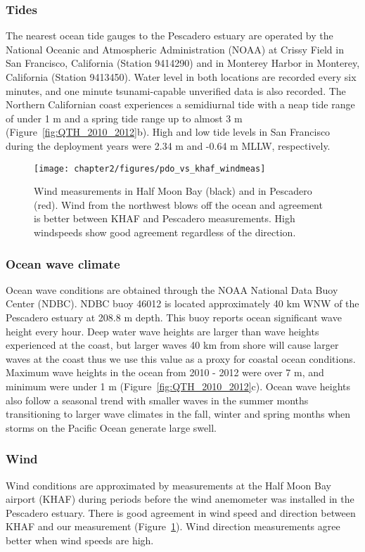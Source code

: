 \subsubsection{Tides}
The nearest ocean tide gauges to the Pescadero estuary are operated by the National Oceanic and Atmospheric Administration (NOAA) at Crissy Field in San Francisco, California (Station 9414290) and in Monterey Harbor in Monterey, California (Station 9413450). Water level in both locations are recorded every six minutes, and one minute tsunami-capable unverified data is also recorded. The Northern Californian coast experiences a semidiurnal tide with a neap tide range of under 1 m and a spring tide range up to almost 3 m (Figure~\ref{fig:QTH_2010_2012}b). High and low tide levels in San Francisco during the deployment years were 2.34 m and -0.64 m MLLW, respectively. 




\begin{figure}[h!]
\centering
	\texttt{[image: chapter2/figures/pdo\_vs\_khaf\_windmeas]} \caption{Wind measurements in Half Moon Bay (black) and in Pescadero (red). Wind from the northwest blows off the ocean and agreement is better between KHAF and Pescadero measurements. High windspeeds show good agreement regardless of the direction.} \label{fig:PDOvsKHAFwind}
\end{figure}

\subsubsection{Ocean wave climate}
Ocean wave conditions are obtained through the NOAA National Data Buoy Center (NDBC). NDBC buoy 46012 is located approximately 40 km WNW of the Pescadero estuary at 208.8 m depth. This buoy reports ocean significant wave height every hour. Deep water wave heights are larger than wave heights experienced at the coast, but larger waves 40 km from shore will cause larger waves at the coast thus we use this value as a proxy for coastal ocean conditions. Maximum wave heights in the ocean from 2010 - 2012 were over 7 m, and minimum were under 1 m (Figure~\ref{fig:QTH_2010_2012}c). Ocean wave heights also follow a seasonal trend with smaller waves in the summer months transitioning to larger wave climates in the fall, winter and spring months when storms on the Pacific Ocean generate large swell.


\subsubsection{Wind}
Wind conditions are approximated by measurements at the Half Moon Bay airport (KHAF) during periods before the wind anemometer was installed in the Pescadero estuary.  There is good agreement in wind speed and direction between KHAF and our measurement (Figure~\ref{fig:PDOvsKHAFwind}). Wind direction measurements agree better when wind speeds are high.

